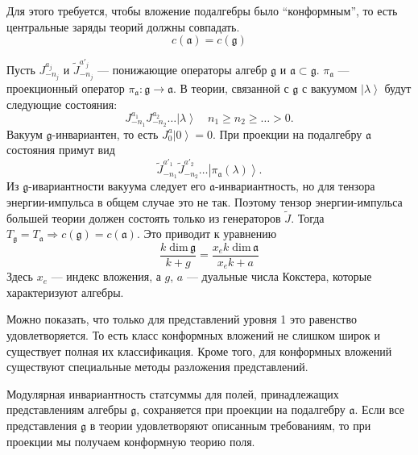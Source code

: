 \documentclass[a4paper,12pt]{article}
\theoremstyle{definition} \newtheorem{Def}{Definition}
\begin{document}
Для этого требуется, чтобы вложение подалгебры было ``конформным'', то есть центральные заряды
теорий должны совпадать.
\begin{equation}
  \label{eq:31}
  c(\mathfrak{a})=c(\mathfrak{g})
\end{equation}

Пусть $J^{a_j}_{-n_j}$ и $\tilde{J}^{a'_j}_{-n_j}$ --- понижающие операторы алгебр  $\mathfrak{g}$ и
$\mathfrak{a}\subset\mathfrak{g}$.  $\pi_{\mathfrak{a}}$ --- проекционный оператор
$\pi_{\mathfrak{a}}:\mathfrak{g}\longrightarrow \mathfrak{a}$. В теории, связанной с  $\mathfrak{g}$
с вакуумом $\left|\lambda\right>$ будут следующие состояния:
\begin{equation}
  \label{eq:109}
  J^{a_1}_{-n_1}J^{a_2}_{-n_2}\dots\left|\lambda\right>\quad n_1\geq n_2\geq \dots>0.
\end{equation}
Вакуум $\mathfrak{g}$-инвариантен, то есть $J_0^a\left|0\right>=0$. При проекции на подалгебру
$\mathfrak{a}$ состояния примут вид
\begin{equation}
  \label{eq:110}
  \tilde{J}^{a'_1}_{-n_1}\tilde{J}^{a'_2}_{-n_2}\dots\left|\pi_{\mathfrak{a}}(\lambda)\right>.
\end{equation}
Из $\mathfrak{g}$-ивариантности вакуума следует его $\mathfrak{a}$-инвариантность, но для тензора
энергии-импульса в общем случае это не так. Поэтому тензор энергии-импульса большей теории должен
состоять только из генераторов $\tilde{J}$. Тогда $T_{\mathfrak{g}}=T_{\mathfrak{a}}\Rightarrow
c(\mathfrak{g})=c(\mathfrak{a})$. Это приводит к уравнению
\begin{equation}
  \label{eq:111}
  \frac{k\;\mathrm{dim}\,\mathfrak{g}}{k+g}=\frac{x_e k\; \mathrm{dim}\,\mathfrak{a}}{x_ek+a}
\end{equation}
Здесь $x_e$ --- индекс вложения, а  $g$, $a$ --- дуальные числа Кокстера, которые характеризуют алгебры.

Можно показать, что только для представлений уровня 1 это равенство удовлетворяется. То есть класс
конформных вложений не слишком широк и существует полная их классификация. Кроме того, для
конформных вложений существуют специальные методы разложения представлений.

Модулярная инвариантность статсуммы для полей, принадлежащих представлениям алгебры  $\mathfrak{g}$,
сохраняется при проекции на подалгебру $\mathfrak{a}$. Если все представления $\mathfrak{g}$ в теории
удовлетворяют описанным требованиям, то при проекции мы получаем конформную теорию поля.
\end{document}
